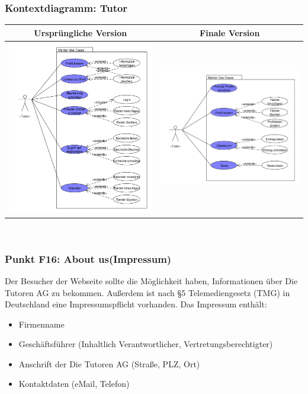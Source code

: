 \begin{frame}
  	\frametitle{Kontextdiagramm: Tutor} 
  
	\begin{tabular}{c|c}
	Ursprüngliche Version & Finale Version\\
	\hline
		\includegraphics[width=0.5\linewidth]{./Source/UseCaseMentor_13.pdf}
		&
		\includegraphics[width=.55\linewidth]{./Source/UseCaseMentor_14.pdf}
	\end{tabular}\\
\end{frame}

\begin{frame}
  	\frametitle{Punkt F16: About us(Impressum)} 
  
	Der Besucher der Webseite sollte die Möglichkeit haben, Informationen über Die Tutoren AG zu bekommen. Außerdem ist nach §5 Telemediengesetz (TMG) in Deutschland eine Impressumspflicht vorhanden.
	\bigskip\newline
	Das Impressum enthält:
	\begin{itemize}
		\item Firmenname
	  	\item Geschäftsführer (Inhaltlich Verantwortlicher, Vertretungsberechtigter)
		\item Anschrift der Die Tutoren AG (Straße, PLZ, Ort)
		\item Kontaktdaten (eMail, Telefon)
	\end{itemize}
\end{frame}

